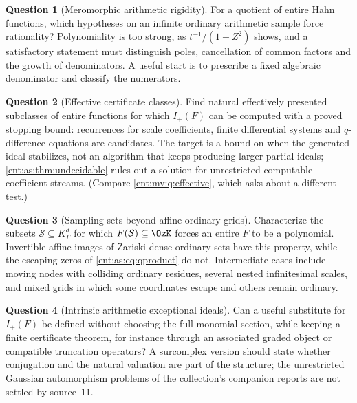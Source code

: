 \documentclass[11pt]{article}
\theoremstyle{plain}
\theoremstyle{plain}
\theoremstyle{plain}
\theoremstyle{definition}
\theoremstyle{definition}
\theoremstyle{definition}
\theoremstyle{definition}
\newtheorem{question}[question]{Question}
\theoremstyle{remark}
\newcommand{\K}{K_\Gamma}\newcommand{\KD}{K_\Delta}
\begin{document}
\begin{question}[Meromorphic arithmetic rigidity]\label{ent:as:q:meromorphic}
For a quotient of entire Hahn functions, which hypotheses on an infinite
ordinary arithmetic sample force rationality? Polynomiality is too strong, as
$t^{-1}/(1+Z^2)$ shows, and a satisfactory statement must distinguish poles,
cancellation of common factors and the growth of denominators. A useful start
is to prescribe a fixed algebraic denominator and classify the numerators.
\end{question}

\begin{question}[Effective certificate classes]\label{ent:as:q:effective}
Find natural effectively presented subclasses of entire functions for which
$I_+(F)$ can be computed with a proved stopping bound: recurrences for scale
coefficients, finite differential systems and $q$-difference equations are
candidates. The target is a bound on when the generated ideal stabilizes, not
an algorithm that keeps producing larger partial ideals;
\cref{ent:as:thm:undecidable} rules out a solution for unrestricted computable
coefficient streams. (Compare \cref{ent:mv:q:effective}, which asks about a
different test.)
\end{question}

\begin{question}[Sampling sets beyond affine ordinary grids]
\label{ent:as:q:sampling-sets}
Characterize the subsets $\mathcal S\subseteq\K^d$ for which
$F(\mathcal S)\subseteq\OzK$ forces an entire $F$ to be a polynomial.
Invertible affine images of Zariski-dense ordinary sets have this property,
while the escaping zeros of \eqref{ent:as:eq:qproduct} do not. Intermediate
cases include moving nodes with colliding ordinary residues, several nested
infinitesimal scales, and mixed grids in which some coordinates escape and
others remain ordinary.
\end{question}

\begin{question}[Intrinsic arithmetic exceptional ideals]
\label{ent:as:q:intrinsic}
Can a useful substitute for $I_+(F)$ be defined without choosing the full
monomial section, while keeping a finite certificate theorem, for instance
through an associated graded object or compatible truncation operators? A
surcomplex version should state whether conjugation and the natural valuation
are part of the structure; the unrestricted Gaussian automorphism problems of
the collection's companion reports are not settled by source~11.
\end{question}
\end{document}
